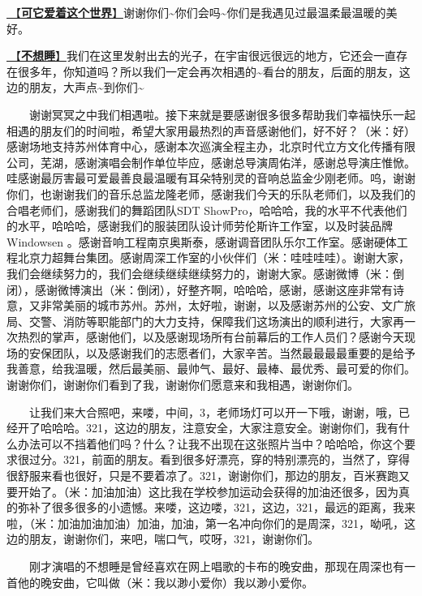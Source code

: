 \documentclass[]{ctexbook}
\begin{document}
\hyperref[love-the-world]{🎵【\textbf{可它爱着这个世界}】}谢谢你们\textasciitilde 你们会吗\textasciitilde 你们是我遇见过最温柔最温暖的美好。

\hyperref[keep-playing]{🎵【\textbf{不想睡}】}我们在这里发射出去的光子，在宇宙很远很远的地方，它还会一直存在很多年，你知道吗？所以我们一定会再次相遇的\textasciitilde 看台的朋友，后面的朋友，这边的朋友，大声点\textasciitilde 到你们\textasciitilde{}

  谢谢冥冥之中我们相遇啦。接下来就是要感谢很多很多帮助我们幸福快乐一起相遇的朋友们的时间啦，希望大家用最热烈的声音感谢他们，好不好？（米：好）感谢场地支持苏州体育中心，感谢本次巡演全程主办，北京时代立方文化传播有限公司，芜湖，感谢演唱会制作单位毕应，感谢总导演周佑洋，感谢总导演庄惟惞。哇感谢最厉害最可爱最善良最温暖有耳朵特别灵的音响总监金少刚老师。呜，谢谢你们，也谢谢我们的音乐总监龙隆老师，感谢我们今天的乐队老师们，以及我们的合唱老师们，感谢我们的舞蹈团队SDT ShowPro，哈哈哈，我的水平不代表他们的水平，哈哈哈，感谢我们的服装团队设计师劳伦斯许工作室，以及时装品牌 Windowsen 。感谢音响工程南京奥斯泰，感谢调音团队乐尔工作室。感谢硬体工程北京力超舞台集团。感谢周深工作室的小伙伴们（米：哇哇哇哇）。谢谢大家，我们会继续努力的，我们会继续继续继续努力的，谢谢大家。感谢微博（米：倒闭），感谢微博演出（米：倒闭），好整齐啊，哈哈哈，感谢，感谢这座非常有诗意，又非常美丽的城市苏州。苏州，太好啦，谢谢，以及感谢苏州的公安、文广旅局、交警、消防等职能部门的大力支持，保障我们这场演出的顺利进行，大家再一次热烈的掌声，感谢他们，以及感谢现场所有台前幕后的工作人员们？感谢今天现场的安保团队，以及感谢我们的志愿者们，大家辛苦。当然最最最最重要的是给予我善意，给我温暖，然后最美丽、最帅气、最好、最棒、最优秀、最可爱的你们。谢谢你们，谢谢你们看到了我，谢谢你们愿意来和我相遇，谢谢你们。

  让我们来大合照吧，来喽，中间，3，老师场灯可以开一下哦，谢谢，哦，已经开了哈哈哈。321，这边的朋友，注意安全，大家注意安全。谢谢你们，我有什么办法可以不挡着他们吗？什么？让我不出现在这张照片当中？哈哈哈，你这个要求很过分。321，前面的朋友。看到很多好漂亮，穿的特别漂亮的，当然了，穿得很舒服来看也很好，只是不要着凉了。321，谢谢你们，那边的朋友，百米赛跑又要开始了。（米：加油加油）这比我在学校参加运动会获得的加油还很多，因为真的弥补了很多很多的小遗憾。来喽，这边喽，321，这边，321，最远的距离，我来啦，（米：加油加油加油）加油，加油，第一名冲向你们的是周深，321，呦吼，这边的朋友，谢谢你们，来吧，喘口气，哎呀，321，谢谢你们。

  刚才演唱的不想睡是曾经喜欢在网上唱歌的卡布的晚安曲，那现在周深也有一首他的晚安曲，它叫做（米：我以渺小爱你）我以渺小爱你。
\end{document}
